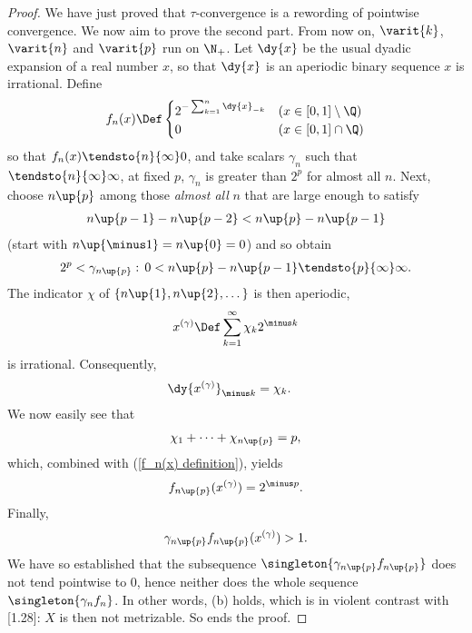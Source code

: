 \begin{proof}
We have just proved that 
%
  $\tau$-convergence is a rewording of pointwise convergence.
%
We now aim to prove the second part.
%
From now on, 
%
  $\varit{k}$, $\varit{n}$ and $\varit{p}$ 
%
run on $\N_+$. Let $\dy{x}$ be the usual dyadic expansion of a real number $x$, 
so that $\dy{x}$ is an aperiodic binary sequence \iif $x$ is irrational. 
%
Define
%
\begin{align}
  \label{f_n(x) definition}
  f_n(x) 
    \Def 
  \begin{cases}
      2^{-\sum_{k= 1}^{n} {\dy{x}_{-k}}} & (x \in [0, 1]\setminus \Q )\\
      0                                            & (x \in [0,1]\cap \Q)
    \end{cases}
\end{align}
%
so that $f_n(x) \tendsto{n}{\infty} 0$, %
%
and take scalars 
%
  $\gamma_n$ 
%
such that $\tendsto{n}{\infty} \infty$, \ie 
%
  at fixed $p$, $\gamma_{n}$ is greater than $2^{p}$ for almost all $n$.
%
Next, choose $n\up{p}$ among those \textit{almost all} $n$ that are 
large enough to satisfy 
%
  \begin{align}
    n\up{p-1} - n\up{p-2} < n\up{p}- n\up{p-1} 
  \end{align}
%
(start with $n\up{\minus 1} = n\up{0} = 0$) and so obtain 
%
  \begin{align}
    2^p < \gamma_{n\up{p}}:\, 
      0< n\up{p} - n\up{p-1}\tendsto{p}{\infty} \infty.
  \end{align}
%
The indicator $\chi$ of 
%
  $\{n\up{1}, n\up{2}, \dots\}$
%
is then aperiodic, \ie 
%
  \def\xgamma{x^{(\gamma)}}
  \begin{align}
    \xgamma 
      \Def
    \sum_{k=1}^\infty \chi_k 2^{\minus k} 
  \end{align}
is irrational. Consequently,
%
  \begin{align}
    \dy{\xgamma}_{\minus k} &= \chi_{k}.
  \end{align}
%
We now easily see that
%
  \begin{align}
    \chi_1 + \cdots + \chi_{n\up{p}} = p, 
  \end{align}
%
which, combined with (\ref{f_n(x) definition}), yields
%
  \begin{align}
    f_{n\up{p}}(\xgamma) = 2^{\minus p}.
  \end{align}
%
Finally,
%
  \begin{align}
    \gamma_{n\up{p}} f_{n\up{p}}(\xgamma) > 1.
  \end{align}
%
We have so established that the subsequence 
%
  $\singleton{\gamma_{n\up{p}}f_{n\up{p}}}$ 
% 
does not tend pointwise to $0$, hence neither does the whole sequence 
%
  $\singleton{\gamma_{n}f_n}$.
%
In other words, (b) holds, which is in violent contrast with [1.28]: 
$X$ is then not metrizable. So ends the proof.
\end{proof}

